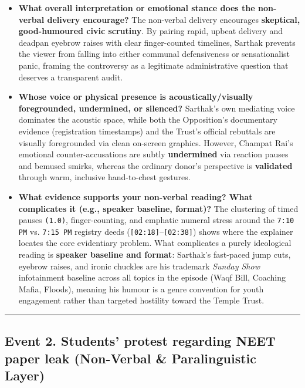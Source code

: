 \documentclass[10pt,a4paper]{article}
\begin{document}
\begin{itemize}
  \item \textbf{What overall interpretation or emotional stance does the non-verbal delivery encourage?}
The non-verbal delivery encourages \textbf{skeptical, good-humoured civic scrutiny}. By pairing rapid, upbeat delivery and deadpan eyebrow raises with clear finger-counted timelines, Sarthak prevents the viewer from falling into either communal defensiveness or sensationalist panic, framing the controversy as a legitimate administrative question that deserves a transparent audit.\par\smallskip
  \item \textbf{Whose voice or physical presence is acoustically/visually foregrounded, undermined, or silenced?}
Sarthak's own mediating voice dominates the acoustic space, while both the Opposition's documentary evidence (registration timestamps) and the Trust's official rebuttals are visually foregrounded via clean on-screen graphics. However, Champat Rai's emotional counter-accusations are subtly \textbf{undermined} via reaction pauses and bemused smirks, whereas the ordinary donor's perspective is \textbf{validated} through warm, inclusive hand-to-chest gestures.\par\smallskip
  \item \textbf{What evidence supports your non-verbal reading? What complicates it (e.g., speaker baseline, format)?}
The clustering of timed pauses \texttt{(1.0)}, finger-counting, and emphatic numeral stress around the \texttt{7:10 PM} vs. \texttt{7:15 PM} registry deeds (\texttt{[02:18]}--\texttt{[02:38]}) shows where the explainer locates the core evidentiary problem. What complicates a purely ideological reading is \textbf{speaker baseline and format}: Sarthak's fast-paced jump cuts, eyebrow raises, and ironic chuckles are his trademark \textit{Sunday Show} infotainment baseline across all topics in the episode (Waqf Bill, Coaching Mafia, Floods), meaning his humour is a genre convention for youth engagement rather than targeted hostility toward the Temple Trust.\par\smallskip
\end{itemize}

\bigskip\hrule\bigskip

\subsection*{Event 2. Students' protest regarding NEET paper leak (Non-Verbal \& Paralinguistic Layer)}
\end{document}
